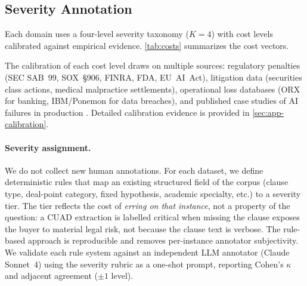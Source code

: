 \documentclass[11pt]{article}
\begin{document}
\subsection{Severity Annotation}
\label{sec:severity-annotation}

Each domain uses a four-level severity taxonomy ($K = 4$) with cost
levels calibrated against empirical evidence. \autoref{tab:costs}
summarizes the cost vectors.

\begin{table}[t]
\centering
\small
{}
\caption{Cost vectors by domain (three orders of magnitude per
domain; calibration in \autoref{sec:app-calibration}).}
\label{tab:costs}
\vspace{-1em}
\end{table}

The calibration of each cost level draws on multiple sources:
regulatory penalties (SEC SAB~99, SOX~\S906, FINRA, FDA, EU~AI~Act),
litigation data (securities class actions, medical malpractice
settlements), operational loss databases (ORX for banking, IBM/Ponemon
for data breaches), and published case studies of AI failures in
production \citep{aircanada2024,prosperspark2023}. Detailed
calibration evidence is provided in \autoref{sec:app-calibration}.

\paragraph{Severity assignment.}
We do not collect new human annotations. For each dataset, we
define deterministic rules that map an existing structured field
of the corpus (clause type, deal-point category, fixed
hypothesis, academic specialty, etc.) to a severity tier. The
tier reflects the cost of \emph{erring on that instance}, not a
property of the question: a CUAD extraction is labelled critical
when missing the clause exposes the buyer to material legal
risk, not because the clause text is verbose. The rule-based
approach is reproducible and removes per-instance annotator
subjectivity. We validate each rule system against an
independent LLM annotator (Claude Sonnet~4) using the severity
rubric as a one-shot prompt, reporting Cohen's $\kappa$ \citep{cohen1960} and
adjacent agreement
($\pm 1$ level).
\end{document}
